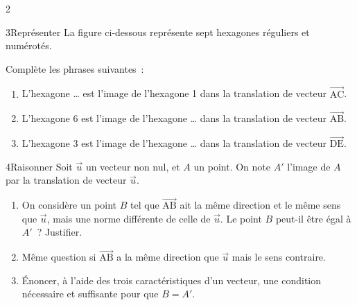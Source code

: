\documentclass[10pt,a4paper]{article}
\newcommand{\starfull}[1]{{\color{#1}\ding{72}}}
\newcommand{\starempty}{{\color{gray!45}\ding{73}}}
\newcommand{\Vj}[1]{\overrightarrow{\text{#1}}}
\newcommand{\Pt}[1]{\textsf{\footnotesize #1}}
\begin{document}
\begin{multicols}{2}
\begin{Exo}{3}{\starfull{diffblue}\starfull{diffblue}\starempty}{Repr\'esenter}
La figure ci-dessous repr\'esente sept hexagones r\'eguliers et num\'erot\'es.
\begin{center}
\end{center}
Compl\`ete les phrases suivantes~:
\begin{enumerate}
\item L'hexagone \dots{} est l'image de l'hexagone 1 dans la translation de vecteur $\Vj{AC}$.
\item L'hexagone 6 est l'image de l'hexagone \dots{} dans la translation de vecteur $\Vj{AB}$.
\item L'hexagone 3 est l'image de l'hexagone \dots{} dans la translation de vecteur $\Vj{DE}$.
\end{enumerate}
\end{Exo}

\columnbreak 

\begin{Exo}{4}{\starfull{diffred}\starfull{diffred}\starfull{diffred}}{Raisonner}
Soit $\vec u$ un vecteur non nul, et $A$ un point. On note $A'$ l'image de $A$ par la translation de vecteur $\vec u$.
\begin{enumerate}
\item On consid\`ere un point $B$ tel que $\Vj{AB}$ ait la m\^eme direction et le m\^eme sens que $\vec u$, mais une norme diff\'erente de celle de $\vec u$. Le point $B$ peut-il \^etre \'egal \`a $A'$~? Justifier.
\item M\^eme question si $\Vj{AB}$ a la m\^eme direction que $\vec u$ mais le sens contraire.
\item \'Enoncer, \`a l'aide des trois caract\'eristiques d'un vecteur, une condition n\'ecessaire et suffisante pour que $B=A'$.
\end{enumerate}
\end{Exo}


\end{multicols}
\end{document}
